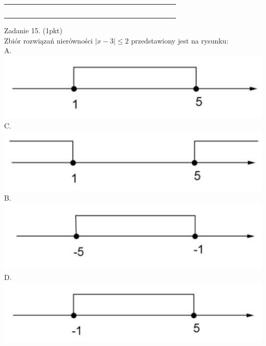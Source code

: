 \documentclass[10pt]{article}
\begin{document}
\begin{center}
\begin{tabular}{|c|c|c|c|c|c|c|c|c|c|c|c|c|c|c|c|c|c|c|c|c|c|c|c|}
\hline
 &  &  &  &  &  &  &  &  &  &  &  &  &  &  &  &  &  &  &  &  &  &  &  \\
\hline
 &  &  &  &  &  &  &  &  &  &  &  &  &  &  &  &  &  &  &  &  &  &  &  \\
\hline
 &  &  &  &  &  &  &  &  &  &  &  &  &  &  &  &  &  &  &  &  &  &  &  \\
\hline
 &  &  &  &  &  &  &  &  &  &  &  &  &  &  &  &  &  &  &  &  &  &  &  \\
\hline
 &  &  &  &  &  &  &  &  &  &  &  &  &  &  &  &  &  &  &  &  &  &  &  \\
\hline
 &  &  &  &  &  &  &  &  &  &  &  &  &  &  &  &  &  &  &  &  &  &  &  \\
\hline
\end{tabular}
\end{center}

Zadanie 15. (1pkt)\\
Zbiór rozwiązań nierówności \(|x-3| \leq 2\) przedstawiony jest na rysunku:\\
A.\\
\includegraphics[max width=\textwidth, center]{2024_11_21_9a9f600c3b3af5013d80g-06(2)}\\
C.\\
\includegraphics[max width=\textwidth, center]{2024_11_21_9a9f600c3b3af5013d80g-06(5)}\\
B.\\
\includegraphics[max width=\textwidth, center]{2024_11_21_9a9f600c3b3af5013d80g-06}\\
D.\\
\includegraphics[max width=\textwidth, center]{2024_11_21_9a9f600c3b3af5013d80g-06(6)}
\end{document}
